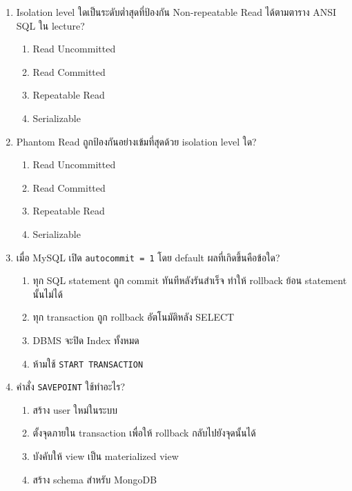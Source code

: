 \documentclass[a4paper,12pt]{article}
\begin{document}
\begin{enumerate}[label=\textbf{\arabic*.}]
    \item Isolation level ใดเป็นระดับต่ำสุดที่ป้องกัน Non-repeatable Read ได้ตามตาราง ANSI SQL ใน lecture?
    \begin{enumerate}[label=\alph*.]
        \item Read Uncommitted
        \item Read Committed
        \item Repeatable Read
        \item Serializable
    \end{enumerate}

    \item Phantom Read ถูกป้องกันอย่างเข้มที่สุดด้วย isolation level ใด?
    \begin{enumerate}[label=\alph*.]
        \item Read Uncommitted
        \item Read Committed
        \item Repeatable Read
        \item Serializable
    \end{enumerate}

    \item เมื่อ MySQL เปิด \texttt{autocommit = 1} โดย default ผลที่เกิดขึ้นคือข้อใด?
    \begin{enumerate}[label=\alph*.]
        \item ทุก SQL statement ถูก commit ทันทีหลังรันสำเร็จ ทำให้ rollback ย้อน statement นั้นไม่ได้
        \item ทุก transaction ถูก rollback อัตโนมัติหลัง SELECT
        \item DBMS จะปิด Index ทั้งหมด
        \item ห้ามใช้ \texttt{START TRANSACTION}
    \end{enumerate}

    \item คำสั่ง \texttt{SAVEPOINT} ใช้ทำอะไร?
    \begin{enumerate}[label=\alph*.]
        \item สร้าง user ใหม่ในระบบ
        \item ตั้งจุดภายใน transaction เพื่อให้ rollback กลับไปยังจุดนั้นได้
        \item บังคับให้ view เป็น materialized view
        \item สร้าง schema สำหรับ MongoDB
    \end{enumerate}


\end{enumerate}
\end{document}
